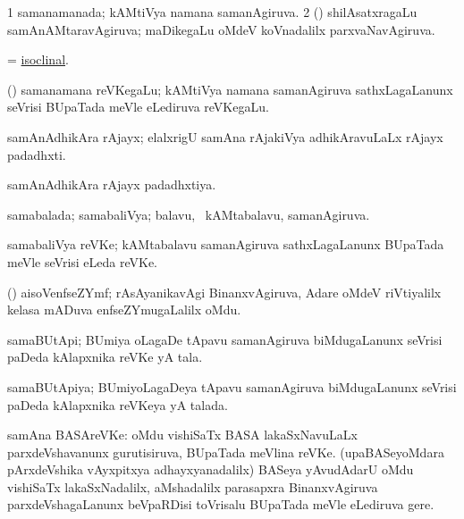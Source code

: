 \bentry
{}
\gl{\gu}
\bmng
\bnum
\num{1} samanamanada; kAMtiVya namana samanAgiruva. 
\num{2} (\BUvi) shilAsatxragaLu samAnAMtaravAgiruva; maDikegaLu oMdeV koVnadalilx parxvaNavAgiruva. 
\enum
\emng
\eentry

\bentry
{}
\gl{\gu}
\bmng
=  \hyperlink{isoclinal}{isoclinal}. 
\emng
\eentry

\bentry
{}
\gl{\nA}
\bmng
(\bava) samanamana reVKegaLu; kAMtiVya namana samanAgiruva sathxLagaLanunx seVrisi BUpaTada meVle eLediruva reVKegaLu. 
\emng
\eentry

\bentry
{}
\gl{\nA}
\bmng
samAnAdhikAra rAjayx; elalxrigU samAna rAjakiVya adhikAravuLaLx rAjayx padadhxti. 
\emng
\eentry

\bentry
{}
\gl{\gu}
\bmng
samAnAdhikAra rAjayx padadhxtiya. 
\emng
\eentry

\bentry
{}
\gl{\gu}
\bmng
samabalada; samabaliVya; balavu, \kanmu\ kAMtabalavu, samanAgiruva. 
\emng
\eentry

\bentry
{}
\gl{\nA}
\bmng
samabaliVya reVKe; kAMtabalavu samanAgiruva sathxLagaLanunx BUpaTada meVle seVrisi eLeda reVKe. 
\emng
\eentry

\bentry
{}
\gl{\nA}
\bmng
(\jiVra) aisoVenfseZYmf; rAsAyanikavAgi BinanxvAgiruva, Adare oMdeV riVtiyalilx kelasa mADuva enfseZYmugaLalilx oMdu. 
\emng
\eentry

\bentry
{}
\gl{\nA}
\bmng
samaBUtApi; BUmiya oLagaDe tApavu samanAgiruva biMdugaLanunx seVrisi paDeda kAlapxnika reVKe yA tala. 
\emng
\eentry

\bentry
{}
\gl{\gu}
\bmng
samaBUtApiya; BUmiyoLagaDeya tApavu samanAgiruva biMdugaLanunx seVrisi paDeda kAlapxnika reVKeya yA talada. 
\emng
\eentry

\bentry
{}
\gl{\nA}
\bmng
samAna BASAreVKe: 
\banum
{} oMdu vishiSaTx BASA lakaSxNavuLaLx parxdeVshavanunx gurutisiruva, BUpaTada meVlina reVKe. 
 (upaBASeyoMdara pArxdeVshika vAyxpitxya adhayxyanadalilx) BASeya yAvudAdarU oMdu vishiSaTx lakaSxNadalilx, aMshadalilx parasapxra BinanxvAgiruva parxdeVshagaLanunx beVpaRDisi toVrisalu BUpaTada meVle eLediruva gere. 
\eanum
\emng
\eentry

